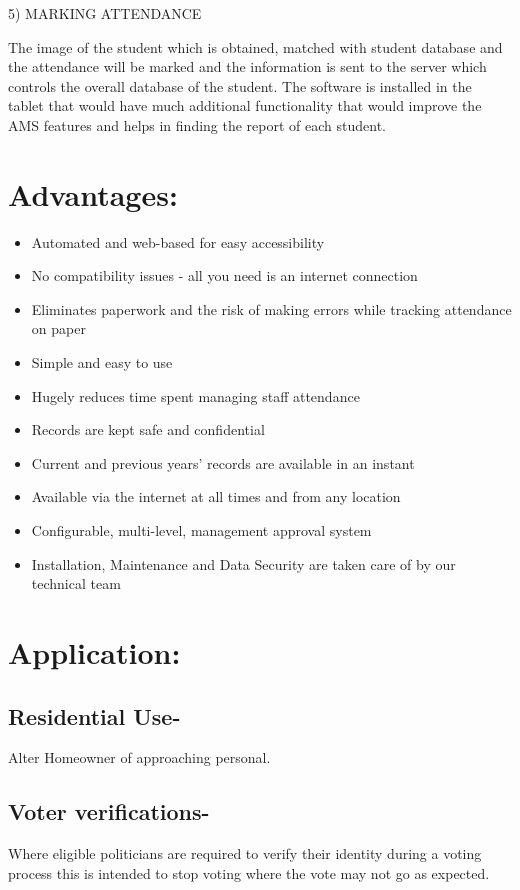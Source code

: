 5) MARKING ATTENDANCE 

The image of the student which is obtained, matched with student database and the attendance will be marked and the information is sent to the server which controls the overall database of the student. The software is installed in the tablet that would have much additional functionality that would improve the AMS features and helps in finding the report of each student. \cite{manju}

\section{Advantages:}

\begin{itemize}
\item Automated and web-based for easy accessibility
\item No compatibility issues - all you need is an internet connection
\item Eliminates paperwork and the risk of making errors while tracking attendance on paper
\item Simple and easy to use
\item Hugely reduces time spent managing staff attendance
\item Records are kept safe and confidential
\item Current and previous years' records are available in an instant
\item Available via the internet at all times and from any location
\item Configurable, multi-level, management approval system
\item Installation, Maintenance and Data Security are taken care of by our technical team
\end{itemize}

\section{Application: }

\subsection{Residential Use-}
Alter Homeowner of approaching personal.

\subsection{Voter verifications-}
Where eligible politicians are required to verify their identity during a voting process this is intended to stop voting where the vote may not go as expected. 

